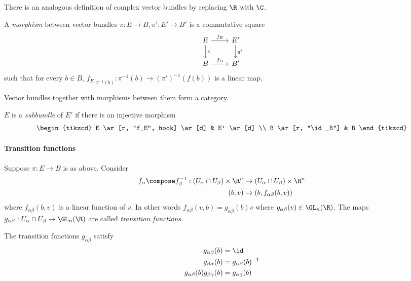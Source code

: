 \documentclass[a4paper]{article}
\begin{document}
There is an analogous definition of complex vector bundles by replacing \(\R\) with \(\C\).

\begin{definition}
  A \emph{morphism} between vector bundles \(\pi: E \to B, \pi': E' \to B'\) is a commutative square
  \[
    \begin{tikzcd}
      E \ar[r, "f_E"] \ar[d, "\pi"] & E' \ar[d, "\pi'"] \\
      B \ar[r, "f_B"] & B'
    \end{tikzcd}
  \]
  such that for every \(b \in B\), \(f_E|_{\pi^{-1}(b)}: \pi^{-1}(b) \to (\pi')^{-1}(f(b))\) is a linear map.
\end{definition}

Vector bundles together with morphisms between them form a category.

\begin{definition}[subbundle]
  \(E\) is a \emph{subbundle} of \(E'\) if there is an injective morphism
  \[
    \begin{tikzcd}
      E \ar[r, "f_E", hook] \ar[d] & E' \ar[d] \\
      B \ar[r, "\id_B"] & B
    \end{tikzcd}
  \]
\end{definition}

\paragraph{Transition functions}

Suppose \(\pi: E \to B\) is as above. Consider
\begin{align*}
  f_\alpha \compose f_\beta^{-1}: (U_\alpha \cap U_\beta) \times \R^n &\to (U_\alpha \cap U_\beta) \times \R^n \\
  (b, v) &\mapsto (b, f_{\alpha\beta}(b, v))
\end{align*}
where \(f_{\alpha\beta}(b, v)\) is a linear function of \(v\). In other words \(f_{\alpha\beta}(v, b) = g_{\alpha\beta}(b) v\) where \(g_{\alpha\beta}(v) \in \GL_n(\R)\). The maps \(g_{\alpha\beta}: U_\alpha \cap U_\beta \to \GL_n(\R)\) are called \emph{transition functions}.

\begin{lemma}
  The transition functions \(g_{\alpha\beta}\) satisfy
  \begin{align*}
    g_{\alpha\beta}(b) &= \id \\
    g_{\beta\alpha}(b) &= g_{\alpha\beta}(b)^{-1} \\
    g_{\alpha\beta}(b) g_{\beta\gamma}(b) &= g_{\alpha\gamma}(b)
  \end{align*}
\end{lemma}
\end{document}
